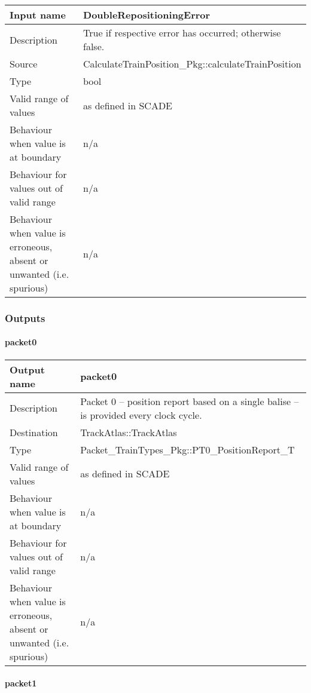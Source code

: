 \begin{longtable}{p{}p{}}
\toprule
Input name				& DoubleRepositioningError \\
\midrule
Description				& True if respective error has occurred; otherwise false. \\
\midrule
Source					& CalculateTrainPosition\_Pkg::calculateTrainPosition \\ 
\midrule
Type					& bool \\
\midrule
Valid range of values	& as defined in SCADE \\
\midrule
Behaviour when value is at boundary	& n/a \\
\midrule
Behaviour for values out of valid range	& n/a \\
\midrule
Behaviour when value is erroneous, absent or unwanted (i.e. spurious) & n/a \\
\bottomrule
\end{longtable}


\subsubsection{Outputs}\label{s:provide_position_report_outputs}

\paragraph{packet0}

\begin{longtable}{p{}p{}}
\toprule
Output name				& packet0 \\
\midrule
Description				& Packet 0 -- position report based on a single balise -- is provided every clock cycle. \\
\midrule
Destination				& TrackAtlas::TrackAtlas\\ 
\midrule
Type					& Packet\_TrainTypes\_Pkg::PT0\_PositionReport\_T \\
\midrule
Valid range of values	& as defined in SCADE \\
\midrule
Behaviour when value is at boundary	& n/a \\
\midrule
Behaviour for values out of valid range	& n/a \\
\midrule
Behaviour when value is erroneous, absent or unwanted (i.e. spurious) & n/a \\
\bottomrule
\end{longtable}


\paragraph{packet1}

